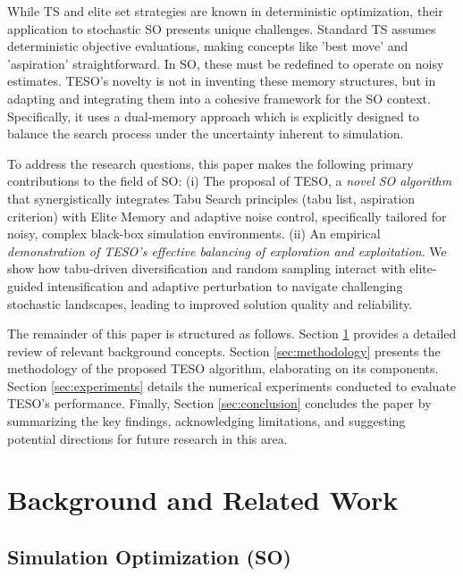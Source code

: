 \documentclass{article}
\begin{document}
While TS and elite set strategies are known in deterministic optimization, their application to stochastic SO presents unique challenges. Standard TS assumes deterministic objective evaluations, making concepts like 'best move' and 'aspiration' straightforward. In SO, these must be redefined to operate on noisy estimates. TESO’s novelty is not in inventing these memory structures, but in adapting and integrating them into a cohesive framework for the SO context. Specifically, it uses a dual-memory approach which is explicitly designed to balance the search process under the uncertainty inherent to simulation.

To address the research questions, this paper makes the following primary contributions to the field of SO:
(i) The proposal of TESO, a \textit{novel SO algorithm} that synergistically integrates Tabu Search principles (tabu list, aspiration criterion) with Elite Memory and adaptive noise control, specifically tailored for noisy, complex black-box simulation environments.
(ii) An empirical \textit{demonstration of TESO's effective balancing of exploration and exploitation}. We show how tabu-driven diversification and random sampling interact with elite-guided intensification and adaptive perturbation to navigate challenging stochastic landscapes, leading to improved solution quality and reliability.

The remainder of this paper is structured as follows. Section \ref{sec:background} provides a detailed review of relevant background concepts. Section \ref{sec:methodology} presents the methodology of the proposed TESO algorithm, elaborating on its components. Section \ref{sec:experiments} details the numerical experiments conducted to evaluate TESO's performance. Finally, Section \ref{sec:conclusion} concludes the paper by summarizing the key findings, acknowledging limitations, and suggesting potential directions for future research in this area.



\section{Background and Related Work}
\label{sec:background}

\subsection{Simulation Optimization (SO)}
\label{subsec:so_definition}
\end{document}
